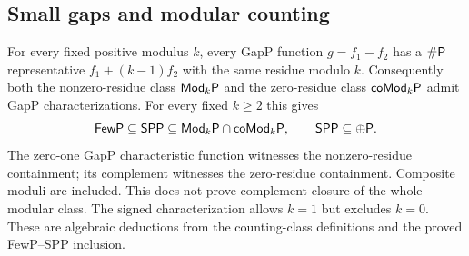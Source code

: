 \begin{result}
\subsection{Small gaps and modular counting}
For every fixed positive modulus $k$, every GapP function $g=f_1-f_2$ has a
$\#\mathsf{P}$ representative $f_1+(k-1)f_2$ with the same residue modulo $k$.
Consequently both the nonzero-residue class $\mathsf{Mod}_k\mathsf{P}$ and the
zero-residue class $\mathsf{coMod}_k\mathsf{P}$ admit GapP characterizations.
For every fixed $k\ge2$ this gives
\[
\mathsf{FewP}\subseteq\mathsf{SPP}\subseteq
\mathsf{Mod}_k\mathsf{P}\cap\mathsf{coMod}_k\mathsf{P},
\qquad \mathsf{SPP}\subseteq\oplus\mathsf{P}.
\]
The zero-one GapP characteristic function witnesses the nonzero-residue
containment; its complement witnesses the zero-residue containment.
Composite moduli are included. This does not prove complement closure of the
whole modular class. The signed characterization allows $k=1$ but excludes
$k=0$. These are algebraic deductions from the counting-class definitions and
the proved FewP--SPP inclusion.\citep{Fortnow1997,FennerFortnowKurtz1994}
\end{result}



